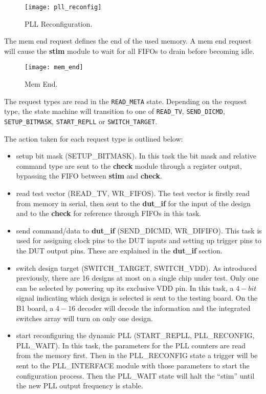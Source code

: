 \begin{figure}[h]
 \centering
 \texttt{[image: pll\_reconfig]}
 \caption{PLL Reconfiguration.}
 \label{fig:req_pll_reconfig}
\end{figure}


The mem end request defines the end of the used memory. A mem end request will cause the \textbf{stim} module
to wait for all FIFOs to drain before becoming idle.
\begin{figure}[h]
 \centering
 \texttt{[image: mem\_end]}
 \caption{Mem End.}
 \label{fig:req_mem_end}
\end{figure}



The request types are read in the \texttt{READ\_META} state. Depending on the request type, the state machine will transition to
one of \texttt{READ\_TV}, \texttt{SEND\_DICMD}, \texttt{SETUP\_BITMASK}, \texttt{START\_REPLL} or \texttt{SWITCH\_TARGET}.

The action taken for each request type is outlined below:
\begin{itemize}
 \item setup bit mask (SETUP\_BITMASK). In this task the bit mask and relative command type are sent to the \textbf{check} module through a register output, bypassing the FIFO between \textbf{stim} and \textbf{check}.

 \item read test vector (READ\_TV, WR\_FIFOS). The test vector is firstly read from memory in serial, then sent to the \textbf{dut\_if} for the input of the design and to the \textbf{check} for reference through FIFOs in this task.

 \item send command/data to \textbf{dut\_if} (SEND\_DICMD, WR\_DIFIFO). This task is used for assigning clock pins to the DUT inputs and setting up trigger pins to the DUT output pins. These are explained in the \textbf{dut\_if} section.

 \item switch design target (SWITCH\_TARGET, SWITCH\_VDD). As introduced previously, there are 16 designs at most on a single chip under test. Only one can be selected by powering up its exclusive VDD pin. In this task, a $4-bit$ signal indicating which design is selected is sent to the testing board. On the B1 board, a $4-16$ decoder will decode the information and the integrated switches array will turn on only one design.

 \item start reconfiguring the dynamic PLL (START\_REPLL, PLL\_RECONFIG, PLL\_WAIT). In this task, the parameters for the PLL counters are read from the memory first. Then in the PLL\_RECONFIG state a trigger will be sent to the PLL\_INTERFACE module with those parameters to start the configuration process. Then the PLL\_WAIT state will halt the ``stim'' until the new PLL output frequency is stable.
\end{itemize}

